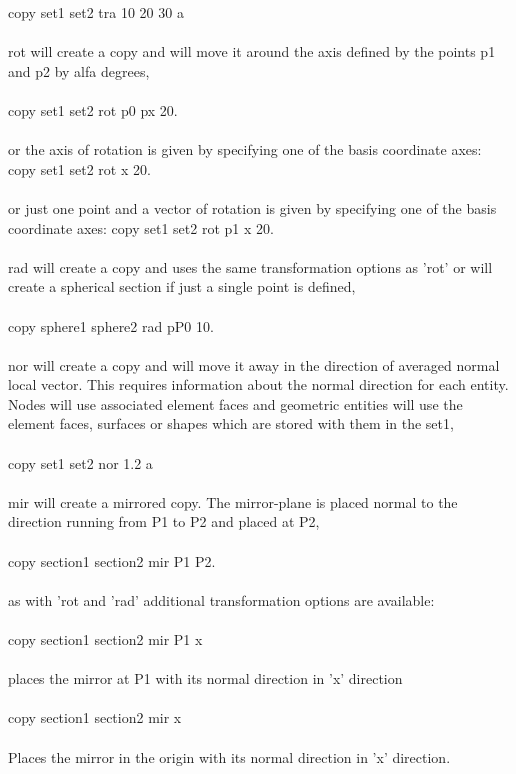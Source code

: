\documentclass{article}
\begin{document}
copy set1 set2 tra 10 20 30 a\\\\
rot will create a copy and will move it around the axis defined by the points p1 and p2 by alfa degrees,\\\\
copy set1 set2 rot p0 px 20.\\\\
or the axis of rotation is given by specifying one of the basis coordinate axes:
copy set1 set2 rot x 20.\\\\
or just one point and a vector of rotation is given by specifying one of the basis coordinate axes:
copy set1 set2 rot p1 x 20.\\\\
rad will create a copy and uses the same transformation options as 'rot' or will create a spherical section if just a single point is defined,\\\\
copy sphere1 sphere2 rad pP0 10.\\\\
nor will create a copy and will move it away in the direction of averaged normal local vector. This requires information about the normal direction for each entity. Nodes will use associated element faces and geometric entities will use the element faces, surfaces or shapes which are stored with them in the set1,\\\\
copy set1 set2 nor 1.2 a\\\\
mir will create a mirrored copy. The mirror-plane is placed normal to the direction running from P1 to P2 and placed at P2,\\\\
copy section1 section2 mir P1 P2.\\\\
as with 'rot and 'rad' additional transformation options are available:\\\\
copy section1 section2 mir P1 x\\\\
places the mirror at P1 with its normal direction in 'x' direction\\\\
copy section1 section2 mir x\\\\
Places the mirror in the origin with its normal direction in 'x' direction.
\end{document}
